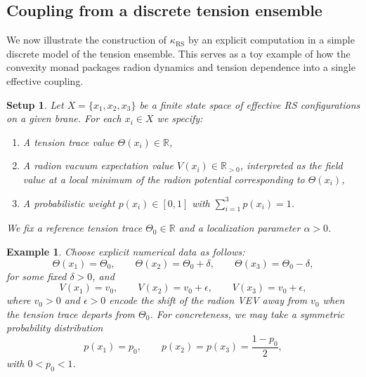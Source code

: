 \documentclass{article}
\newtheorem{eg}{Example}
\newtheorem{setup}{Setup}
\numberwithin{tm}{section}
\numberwithin{dn}{section}
\numberwithin{as}{section}
\numberwithin{rk}{section}
\numberwithin{lem}{section}
\numberwithin{ax}{section}
\numberwithin{pp}{section}
\numberwithin{eg}{section}
\numberwithin{war}{section}
\numberwithin{equation}{section}
\numberwithin{prop}{section}
\numberwithin{nt}{section}
\numberwithin{rc}{section}
\numberwithin{setup}{section}
\begin{document}
	\subsection{Coupling from a discrete tension ensemble}
	
	We now illustrate the construction of $\kappa_{\mathrm{RS}}$ by an explicit computation in a simple discrete model of the tension ensemble. This serves as a toy example of how the convexity monad packages radion dynamics and tension dependence into a single effective coupling.
	
	\begin{setup}
		Let $X = \{x_1, x_2, x_3\}$ be a finite state space of effective RS configurations on a given brane. For each $x_i \in X$ we specify:
		\begin{enumerate}
			\item A tension trace value $\Theta(x_i) \in \mathbb{R}$,
			\item A radion vacuum expectation value $V(x_i) \in \mathbb{R}_{>0}$, interpreted as the field value at a local minimum of the radion potential corresponding to $\Theta(x_i)$,
			\item A probabilistic weight $p(x_i) \in [0,1]$ with $\sum_{i=1}^3 p(x_i) = 1$.
		\end{enumerate}
		We fix a reference tension trace $\Theta_0 \in \mathbb{R}$ and a localization parameter $\alpha > 0$.
	\end{setup}
	
	\begin{eg}
		Choose explicit numerical data as follows:
		\[
		\Theta(x_1) = \Theta_0, \qquad
		\Theta(x_2) = \Theta_0 + \delta, \qquad
		\Theta(x_3) = \Theta_0 - \delta,
		\]
		for some fixed $\delta > 0$, and
		\[
		V(x_1) = v_0, \qquad
		V(x_2) = v_0 + \epsilon, \qquad
		V(x_3) = v_0 + \epsilon,
		\]
		where $v_0 > 0$ and $\epsilon > 0$ encode the shift of the radion VEV away from $v_0$ when the tension trace departs from $\Theta_0$. For concreteness, we may take a symmetric probability distribution
		\[
		p(x_1) = p_0, \qquad
		p(x_2) = p(x_3) = \frac{1 - p_0}{2},
		\]
		with $0 < p_0 < 1$.
	\end{eg}
	
\end{document}
